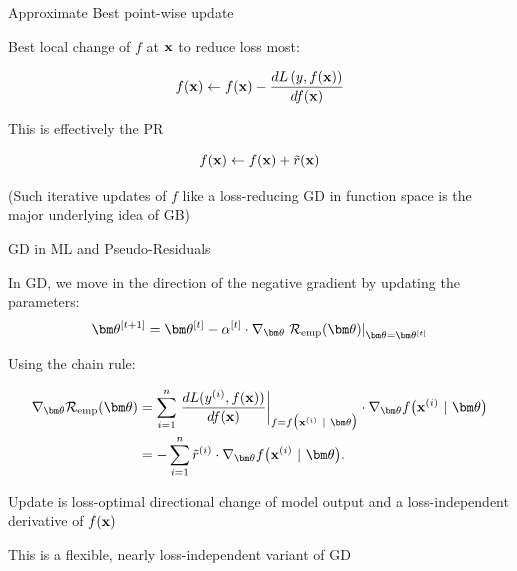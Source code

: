 \documentclass[11pt,compress,t,notes=noshow, xcolor=table]{beamer}
\begin{document}
\begin{framei}[sep=M, fs=normal]{Approximate Best point-wise update}

\item Best local change of $f$ at $\mathbf{x}$ to reduce loss most:

$$
f(\mathbf{x}) \leftarrow f(\mathbf{x}) - \frac{d L\left(y, f(\mathbf{x})\right)}{d f(\mathbf{x})} 
$$

\item This is effectively the PR 

$$
f(\mathbf{x}) \leftarrow f(\mathbf{x}) + \tilde{r}(\mathbf{x})
$$

\item (Such iterative updates of $f$ like a loss-reducing GD in function space is the major underlying idea of GB)

\end{framei}


\begin{framei}[sep=M]{GD in ML and Pseudo-Residuals}

\item In GD, we move in the direction of the negative gradient by updating the parameters: 
$$\thetav^{[t + 1]} = \thetav^{[t]} - \alpha^{[t]} \cdot \nabla_{\thetav} \left.\risket\right|_{\thetav = \thetav^{[t]}}	$$

\item Using the chain rule:

\begin{align*}
\nabla_{\thetav} \risket &=\sumin \left.\frac{d L(\yi, \fx)}{d \fx} \right|_{f = \fxit} 
\cdot \nabla_{\thetav} \fxit \\ 
&= - \sumin \tilde r^{(i)} \cdot \nabla_{\thetav} \fxit.
\end{align*}
\item Update is loss-optimal directional change of model output 
and a loss-independent derivative of $f(\mathbf{x})$
\item This is a flexible, nearly loss-independent variant of GD

\end{framei}
\end{document}
